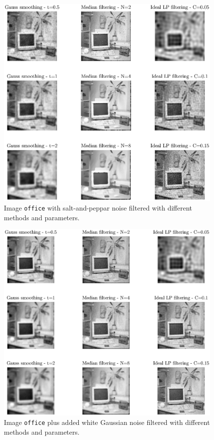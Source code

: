 \documentclass[12pt]{article}
\begin{document}
\begin{figure}[htbp]
 \centering
 \includegraphics[width=\textwidth]{q17b}
 \caption{Image \texttt{office} with salt-and-peppar noise filtered with different methods and parameters.}
 \label{fig:q17b}
\end{figure}

\begin{figure}[htbp]
 \centering
 \includegraphics[width=\textwidth]{q17c}
 \caption{Image \texttt{office} plus added white Gaussian noise filtered with different methods and parameters.}
 \label{fig:q17c}
\end{figure}
\end{document}
